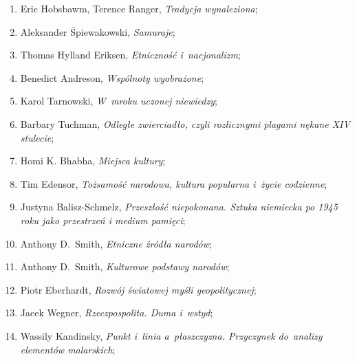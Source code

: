 \documentclass[a4paper,11pt]{article}
\begin{document}
\begin{enumerate}
\item Eric Hobsbawm, Terence Ranger, \textit{Tradycja wynaleziona};



\item Aleksander Śpiewakowski, \textit{Samuraje};



\item Thomas Hylland Eriksen, \textit{Etniczność i~nacjonalizm};



\item Benedict Andreson, \textit{Wspólnoty wyobrażone};



\item Karol Tarnowski, \textit{W~mroku uczonej niewiedzy};



\item Barbary Tuchman, \textit{Odległe zwierciadło, czyli rozlicznymi
    plagami nękane XIV stulecie};



\item Homi K. Bhabha, \textit{Miejsca kultury};



\item Tim Edensor, \textit{Tożsamość narodowa, kultura popularna i~życie
    codzienne};



\item Justyna Balisz-Schmelz, \textit{Przeszłość niepokonana. Sztuka
    niemiecka po 1945 roku jako przestrzeń i medium pamięci};



\item Anthony D.~Smith, \textit{Etniczne źródła narodów};



\item Anthony D.~Smith, \textit{Kulturowe podstawy narodów};



\item Piotr Eberhardt, \textit{Rozwój światowej myśli geopolitycznej};



\item Jacek Wegner, \textit{Rzeczpospolita. Duma i~wstyd};



\item Wassily Kandinsky, \textit{Punkt i~linia a~płaszczyzna. Przyczynek
    do~analizy elementów malarskich};




\end{enumerate}
\end{document}
